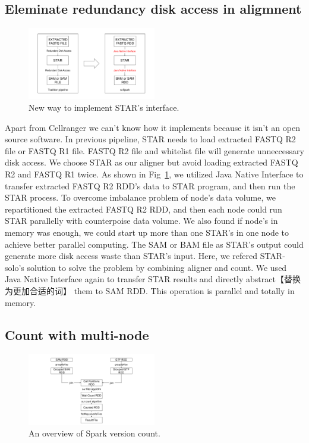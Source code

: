\documentclass[conference]{IEEEtran}
\begin{document}
\subsection{Eleminate redundancy disk access in aligmnent}
\begin{figure}
  \includegraphics[width=0.5\textwidth]{fig2.pdf}
  \caption{New way to implement STAR's interface.} \label{fig2}
\end{figure}

Apart from Cellranger we can't know how it implements because it isn't an open source software. 
In previous pipeline, STAR needs to load extracted FASTQ R2 file or FASTQ R1 file. FASTQ R2 file and whitelist file will generate unneccessary disk access. 
We choose STAR as our aligner but avoid loading extracted FASTQ R2 and FASTQ R1 twice. 
As shown in Fig~\ref{fig2}, we utilized Java Native Interface to transfer extracted FASTQ R2 RDD's data to STAR program, and then run the STAR process. 
To overcome imbalance problem of node's data volume, we repartitioned the extracted FASTQ R2 RDD, and then each node could run STAR parallelly with counterpoise data volume. 
We also found if node's in memory was enough, we could start up more than one STAR's in one node to achieve better parallel computing. 
The SAM or BAM file as STAR's output could generate more disk access waste than STAR's input. Here, we refered STAR-solo's solution to solve the problem by combining aligner and count. 
We used Java Native Interface again to transfer STAR results and directly abstract【替换为更加合适的词】 them to SAM RDD. 
This operation is parallel and totally in memory. 

\subsection{Count with multi-node}

\begin{figure}
  \includegraphics[width=0.5\textwidth]{fig3.pdf}
  \caption{An overview of Spark version count.} \label{fig3}
\end{figure}
\end{document}
